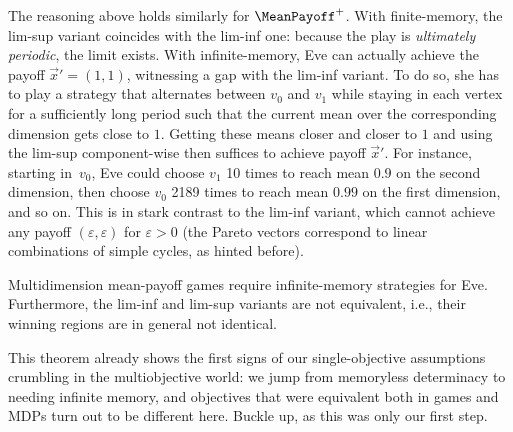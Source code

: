 \begin{example}
\label{12-ex:MMP3}
The reasoning above holds similarly for $\MeanPayoff^{+}$. With finite-memory, the lim-sup variant coincides with the lim-inf one: because the play is \textit{ultimately periodic}, the limit exists. With infinite-memory, Eve can actually achieve the payoff $\vec{x}' = (1, 1)$, witnessing a gap with the lim-inf variant. To do so, she has to play a strategy that alternates between $v_0$ and $v_1$ while staying in each vertex for a sufficiently long period such that the current mean over the corresponding dimension gets close to $1$. Getting these means closer and closer to $1$ and using the lim-sup component-wise then suffices to achieve payoff $\vec{x}'$. For instance, starting in~$v_0$, Eve could choose  $v_1$ 10 times to reach mean $0.9$ on the second dimension, then choose $v_0$ 2189 times to reach mean $0.99$ on the first dimension, and so on. This is in stark contrast to the lim-inf variant, which cannot achieve any payoff $(\varepsilon, \varepsilon)$ for $\varepsilon > 0$ (the Pareto vectors correspond to linear combinations of simple cycles, as hinted before).
\end{example}

\begin{theorem}
\label{12-thm:MMP-Eve}
Multidimension mean-payoff games require infinite-memory strategies for Eve. Furthermore, the lim-inf and lim-sup variants are not equivalent, i.e., their winning regions are in general not identical.
\end{theorem}

This theorem already shows the first signs of our single-objective assumptions crumbling in the multiobjective world: we jump from memoryless determinacy to needing infinite memory, and objectives that were equivalent both in games and MDPs turn out to be different here. Buckle up, as this was only our first step.
